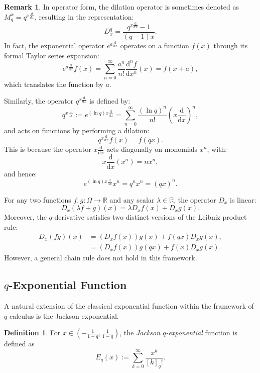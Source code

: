 \documentclass[10pt]{amsart}
\theoremstyle{plain}
\theoremstyle{definition}
\newtheorem{definition}[theorem]{Definition}
\newtheorem{remark}[theorem]{Remark}
\begin{document}
\begin{remark}
In operator form, the dilation operator is sometimes denoted as $ M_q^x = q^{x \frac{d}{dx}} $, resulting in the representation:
\[
D_x^{q} = \frac{q^{x \frac{\mathrm{d}}{dx}} - 1}{(q - 1)x}.
\]
In fact, the exponential operator $ e^{a \frac{\mathrm{d}}{\mathrm{d}x}} $ operates on a function $ f(x) $ through its formal Taylor series expansion:
\[
e^{a \frac{\mathrm{d}}{\mathrm{d}x}} f(x) = \sum_{n=0}^{\infty} \frac{a^n}{n!} \frac{\mathrm{d}^n f}{\mathrm{d}x^n}(x) = f(x + a),
\]
which translates the function by $ a $.

Similarly, the operator $ q^{x \frac{\mathrm{d}}{\mathrm{d}x}} $ is defined by:
\[
q^{x \frac{\mathrm{d}}{\mathrm{d}x}} := e^{(\ln q) x \frac{\mathrm{d}}{\mathrm{d}x}} = \sum_{n=0}^{\infty} \frac{(\ln q)^n}{n!} \left( x \frac{\mathrm{d}}{\mathrm{d}x} \right)^n,
\]
and acts on functions by performing a dilation:
\[
q^{x \frac{\mathrm{d}}{\mathrm{d}x}} f(x) = f(qx).
\]
This is because the operator $ x \frac{\mathrm{d}}{\mathrm{d}x} $ acts diagonally on monomials $ x^n $, with:
\[
x \frac{\mathrm{d}}{\mathrm{d}x} (x^n) = n x^n,
\]
and hence:
\[
e^{(\ln q) x \frac{\mathrm{d}}{\mathrm{d}x}} x^n = q^n x^n = (qx)^n.
\]
\end{remark}




For any two functions $ f, g : \Omega \to \mathbb{R} $ and any scalar $ \lambda \in \mathbb{R} $, the operator $D_{x}$ is linear:
\[
D_x(\lambda f + g)(x) = \lambda D_x f(x) + D_x g(x).
\]
Moreover, the $q$-derivative satisfies two distinct versions of the Leibniz product rule:
\begin{align*}
D_x(fg)(x) &= (D_x f(x)) g(x) + f(qx) D_x g(x), \\
           &= (D_x f(x)) g(qx) + f(x) D_x g(x).
\end{align*}
However, a general chain rule does not hold in this framework.



\subsection{$q$-Exponential Function}
A natural extension of the classical exponential function within the framework of $q$-calculus is the Jackson exponential.


\begin{definition}
For $ x \in \left(-\frac{1}{1 - q}, \frac{1}{1 - q}\right) $, the \textit{Jackson $q$-exponential} function is defined as
\[
E_q(x) := \sum_{k=0}^{\infty} \frac{x^k}{[k]_q!}.
\]
\end{definition}
\end{document}
